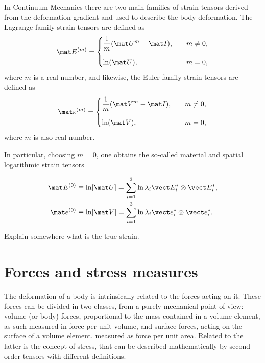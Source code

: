 In Continuum Mechanics there are two main families of strain tensors derived from the deformation gradient and used to describe the body deformation.
The Lagrange family strain tensors are defined as
\begin{equation}
    \mat E^{(m)} =\begin{cases} \displaystyle{\frac{1}{m} (\mat U^m - \mat I)},&\quad m\neq 0,\\[12pt] \ln(\mat U),& \quad m=0, \end{cases}
\end{equation} where $m$ is a real number, and likewise, the Euler family strain tensors are defined as
\begin{equation}
     \mat \varepsilon^{(m)} =\begin{cases} \displaystyle{\frac{1}{m} (\mat V^m - \mat I)},&\quad m\neq 0,\\[12pt] \ln(\mat V),& \quad m=0, \end{cases}
\end{equation}
where $m$ is also real number.

\enlargethispage{\baselineskip}
In particular, choosing $m=0$, one obtains the so-called material and spatial logarithmic strain tensors
\begin{highlight}[innertopmargin=-5pt]
    \begin{align}
        \mat E^{(0)} &\equiv \ln[\mat U] = \sum_{i=1}^3 \ln \lambda_i \vect E_i^*\otimes \vect E_i^*,\\
        \mat e^{(0)} &\equiv \ln [\mat V] = \sum_{i=1}^3 \ln \lambda_i \vect e_i^*\otimes \vect e_i^*.
    \end{align}
\end{highlight}

\colorbox{BrickRed}{Explain somewhere what is the true strain.}

\section{Forces and stress measures}

The deformation of a body is intrinsically related to the forces acting on it.
These forces can be divided in two classes, from a purely mechanical point of view: volume (or body) forces, proportional to the mass contained in a volume element, as such measured in force per unit volume, and surface forces, acting on the surface of a volume element, measured as force per unit area.
Related to the latter is the concept of stress, that can be described mathematically by second order tensors with different definitions.


